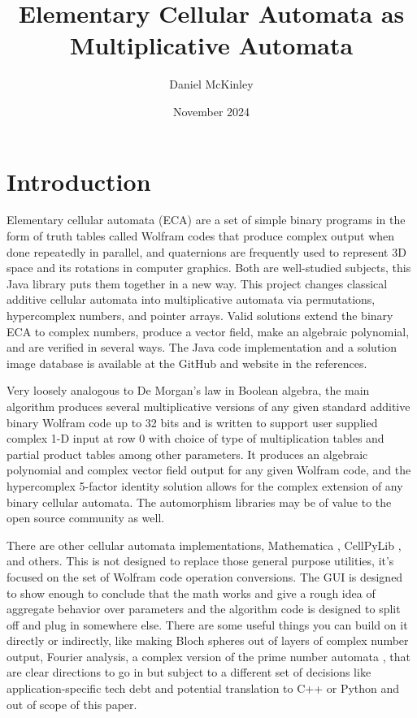 \documentclass[11pt]{article}
\title{Elementary Cellular Automata as Multiplicative Automata}
\date{November 2024}
\author{Daniel McKinley}
\begin{document}
\maketitle


\section{Introduction}

Elementary cellular automata (ECA) are a set of simple binary programs in the form of truth tables called Wolfram codes that produce complex output when done repeatedly in parallel, and quaternions are frequently used to represent 3D space and its rotations in computer graphics. Both are well-studied subjects, this Java library puts them together in a new way. This project changes classical additive cellular automata into multiplicative automata \cite{Wolfram} via permutations, hypercomplex numbers, and pointer arrays. Valid solutions extend the binary ECA to complex numbers, produce a vector field, make an algebraic polynomial, and are verified in several ways. The Java code implementation \cite{mygit} and a solution image database \cite{dmwebsite} is available at the GitHub and website in the references.

 Very loosely analogous to De Morgan's law in Boolean algebra, the main algorithm produces several multiplicative versions of any given standard additive binary Wolfram code up to 32 bits and is written to support user supplied complex 1-D input at row 0 with choice of type of multiplication tables and partial product tables among other parameters. It produces an algebraic polynomial and complex vector field output for any given Wolfram code, and the hypercomplex 5-factor identity solution allows for the complex extension of any binary cellular automata.  The automorphism libraries may be of value to the open source community as well. 

There are other cellular automata implementations, Mathematica \cite{Mathematica}, CellPyLib \cite{Antunes2021}, and others. This is not designed to replace those general purpose utilities, it's focused on the set of Wolfram code operation conversions. The GUI is designed to show enough to conclude that the math works and give a rough idea of aggregate behavior over parameters and the algorithm code is designed to split off and plug in somewhere else. There are some useful things you can build on it directly or indirectly, like making Bloch spheres out of layers of complex number output, Fourier analysis, a complex version of the prime number automata \cite{Wolfram}, that are clear directions to go in but subject to a different set of decisions like application-specific tech debt and potential translation to C++ or Python and out of scope of this paper.
\end{document}
